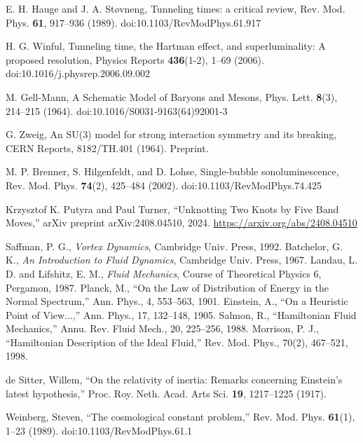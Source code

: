 \documentclass[10pt,reprint,aps,onecolumn,nofootinbib]{revtex4-2}
\begin{document}
\begin{thebibliography}{99}
     E. H. Hauge and J. A. St{\o}vneng, Tunneling times: a critical review, Rev. Mod. Phys. \textbf{61}, 917--936 (1989). doi:10.1103/RevModPhys.61.917

     H. G. Winful, Tunneling time, the Hartman effect, and superluminality: A proposed resolution,
    Physics Reports \textbf{436}(1-2), 1--69 (2006). doi:10.1016/j.physrep.2006.09.002

     M. Gell-Mann, A Schematic Model of Baryons and Mesons, Phys. Lett. \textbf{8}(3), 214--215 (1964). doi:10.1016/S0031-9163(64)92001-3

     G. Zweig, An SU(3) model for strong interaction symmetry and its breaking, CERN Reports, 8182/TH.401 (1964). Preprint.

     M. P. Brenner, S. Hilgenfeldt, and D. Lohse, Single-bubble sonoluminescence, Rev. Mod. Phys. \textbf{74}(2), 425--484 (2002). doi:10.1103/RevModPhys.74.425

     Krzysztof K. Putyra and Paul Turner, ``Unknotting Two Knots by Five Band Moves,'' arXiv preprint arXiv:2408.04510, 2024. \url{https://arxiv.org/abs/2408.04510}

     Saffman, P. G., \emph{Vortex Dynamics}, Cambridge Univ. Press, 1992.
     Batchelor, G. K., \emph{An Introduction to Fluid Dynamics}, Cambridge Univ. Press, 1967.
     Landau, L. D. and Lifshitz, E. M., \emph{Fluid Mechanics}, Course of Theoretical Physics 6, Pergamon, 1987.
     Planck, M., ``On the Law of Distribution of Energy in the Normal Spectrum,'' Ann. Phys., 4, 553--563, 1901.
     Einstein, A., ``On a Heuristic Point of View...,'' Ann. Phys., 17, 132--148, 1905.
     Salmon, R., ``Hamiltonian Fluid Mechanics,'' Annu. Rev. Fluid Mech., 20, 225--256, 1988.
     Morrison, P. J., ``Hamiltonian Description of the Ideal Fluid,'' Rev. Mod. Phys., 70(2), 467--521, 1998.

     de Sitter, Willem, ``On the relativity of inertia: Remarks concerning Einstein’s latest hypothesis,'' Proc. Roy. Neth. Acad. Arts Sci. \textbf{19}, 1217–1225 (1917).

     Weinberg, Steven, ``The cosmological constant problem,'' Rev. Mod. Phys. \textbf{61}(1), 1--23 (1989). doi:10.1103/RevModPhys.61.1


\end{thebibliography}
\end{document}
